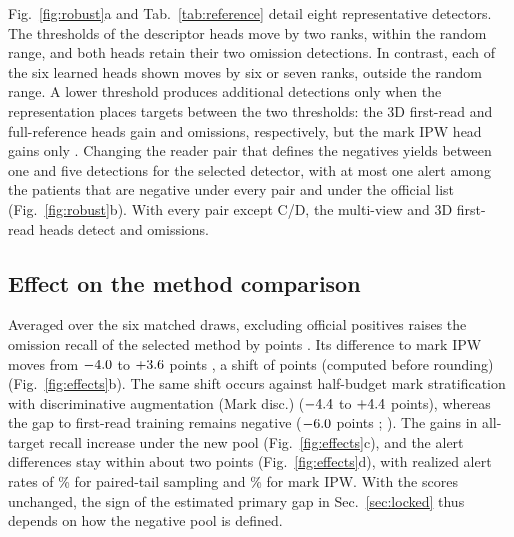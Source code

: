 Fig.~\ref{fig:robust}a and Tab.~\ref{tab:reference} detail eight representative detectors. The thresholds of the descriptor heads move by two ranks, within the random range, and both heads retain their two omission detections. In contrast, each of the six learned heads shown moves by six or seven ranks, outside the random range. A lower threshold produces additional detections only when the representation places targets between the two thresholds: the 3D first-read and full-reference heads gain \GainFirst{} and \GainFull{} omissions, respectively, but the mark IPW head gains only \GainIpw{}. Changing the reader pair that defines the negatives yields between one and five detections for the selected detector, with at most one alert among the \RoleTest{} patients that are negative under every pair and under the official list (Fig.~\ref{fig:robust}b). With every pair except C/D, the multi-view and 3D first-read heads detect \PairsMultiView{} and \PairsFirst{} omissions.

\begin{table}[t]
\centering\small
\setlength{\tabcolsep}{3pt}
\caption{Fixed scores under two negative pools: counts under the C/D threshold $\to$ after excluding official positives, of \NOmitTest{} omissions (Omit.), \NTargetTest{} targets (All) and \UTest{} common-negative test patients (Alert). Drop: in ranks of the original pool.}
\label{tab:reference}

\end{table}

\subsection{Effect on the method comparison}

Averaged over the six matched draws, excluding official positives raises the omission recall of the selected method by \PairChange{} points \PairChangeCI{}. Its difference to mark IPW moves from $-4.0$ to $+3.6$ points \PairRelativeUCI{}, a shift of \ReferenceInteraction{} points (computed before rounding) \ReferenceInteractionCI{} (Fig.~\ref{fig:effects}b). The same shift occurs against half-budget mark stratification with discriminative augmentation (Mark disc.) ($-4.4$ to $+4.4$ points), whereas the gap to first-read training remains negative ($-6.0$ points \FirstRelUCI{}; ). The gains in all-target recall increase under the new pool (Fig.~\ref{fig:effects}c), and the alert differences stay within about two points (Fig.~\ref{fig:effects}d), with realized alert rates of \RealizedAlertPair\% for paired-tail sampling and \RealizedAlertIpw\% for mark IPW. With the scores unchanged, the sign of the estimated primary gap in Sec.~\ref{sec:locked} thus depends on how the negative pool is defined.


